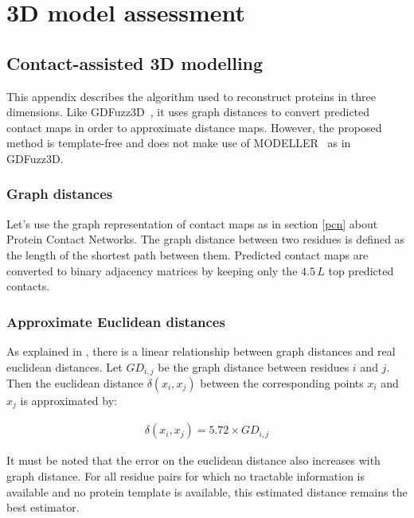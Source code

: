 \chapter{3D model assessment}

    \section{Contact-assisted 3D modelling}

    This appendix describes the algorithm used to reconstruct
    proteins in three dimensions. Like GDFuzz3D~\cite{pietal2015gdfuzz3d},
    it uses graph distances to convert predicted contact maps
    in order to approximate distance maps. However, the proposed method is template-free
    and does not make use of MODELLER~\cite{modeller} as in GDFuzz3D.

    \subsection{Graph distances}

        Let's use the graph representation of contact maps as in section \ref{pcn}
        about Protein Contact Networks.
        The graph distance between two residues is defined as the length of
        the shortest path between them.
        Predicted contact maps are converted to binary adjacency matrices
        by keeping only the $4.5\,L$ top predicted contacts.

    \subsection{Approximate Euclidean distances}

        As explained in \cite{pietal2015gdfuzz3d}, there is a linear relationship
        between graph distances and real euclidean distances.
        Let $GD_{i,j}$ be the graph distance between residues $i$ and $j$. Then
        the euclidean distance $\delta(x_i, x_j)$ between the corresponding
        points $x_i$ and $x_j$ is approximated by:

        \begin{align}
            \delta(x_i, x_j) = 5.72 \times GD_{i,j}
        \end{align}

        It must be noted that the error on the euclidean distance also increases
        with graph distance. For all residue pairs for which no tractable information
        is available and no protein template is available,
        this estimated distance remains the best estimator.

